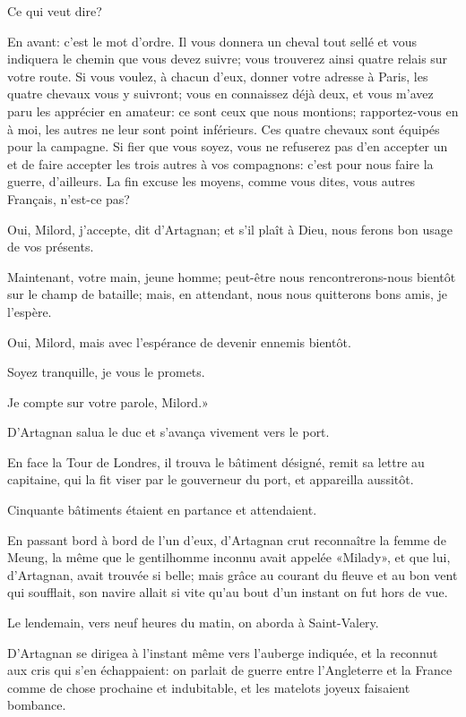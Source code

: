 \speak  Ce qui veut dire? 

\speak  En avant: c'est le mot d'ordre. Il vous donnera un cheval tout sellé et vous indiquera le chemin que vous devez suivre; vous trouverez ainsi quatre relais sur votre route. Si vous voulez, à chacun d'eux, donner votre adresse à Paris, les quatre chevaux vous y suivront; vous en connaissez déjà deux, et vous m'avez paru les apprécier en amateur: ce sont ceux que nous montions; rapportez-vous en à moi, les autres ne leur sont point inférieurs. Ces quatre chevaux sont équipés pour la campagne. Si fier que vous soyez, vous ne refuserez pas d'en accepter un et de faire accepter les trois autres à vos compagnons: c'est pour nous faire la guerre, d'ailleurs. La fin excuse les moyens, comme vous dites, vous autres Français, n'est-ce pas? 

\speak  Oui, Milord, j'accepte, dit d'Artagnan; et s'il plaît à Dieu, nous ferons bon usage de vos présents. 

\speak  Maintenant, votre main, jeune homme; peut-être nous rencontrerons-nous bientôt sur le champ de bataille; mais, en attendant, nous nous quitterons bons amis, je l'espère. 

\speak  Oui, Milord, mais avec l'espérance de devenir ennemis bientôt. 

\speak  Soyez tranquille, je vous le promets. 

\speak  Je compte sur votre parole, Milord.» 

D'Artagnan salua le duc et s'avança vivement vers le port. 

En face la Tour de Londres, il trouva le bâtiment désigné, remit sa lettre au capitaine, qui la fit viser par le gouverneur du port, et appareilla aussitôt. 

Cinquante bâtiments étaient en partance et attendaient. 

En passant bord à bord de l'un d'eux, d'Artagnan crut reconnaître la femme de Meung, la même que le gentilhomme inconnu avait appelée «Milady», et que lui, d'Artagnan, avait trouvée si belle; mais grâce au courant du fleuve et au bon vent qui soufflait, son navire allait si vite qu'au bout d'un instant on fut hors de vue. 

Le lendemain, vers neuf heures du matin, on aborda à Saint-Valery. 

D'Artagnan se dirigea à l'instant même vers l'auberge indiquée, et la reconnut aux cris qui s'en échappaient: on parlait de guerre entre l'Angleterre et la France comme de chose prochaine et indubitable, et les matelots joyeux faisaient bombance. 

